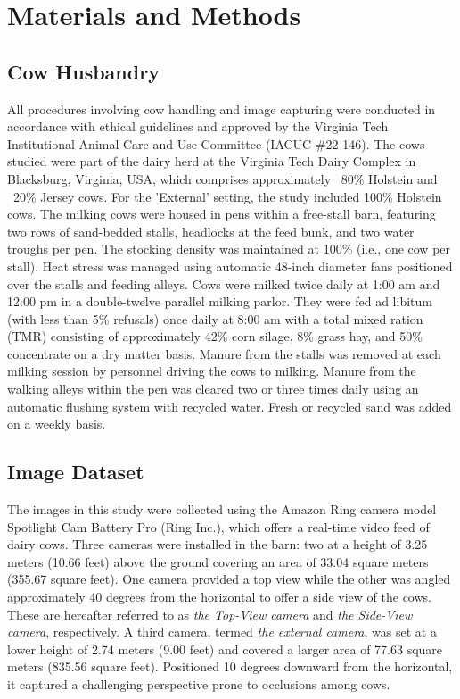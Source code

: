 \section{Materials and Methods}

\subsection*{Cow Husbandry}

All procedures involving cow handling and image capturing were conducted in accordance with ethical guidelines and approved by the Virginia Tech Institutional Animal Care and Use Committee (IACUC \#22-146). The cows studied were part of the dairy herd at the Virginia Tech Dairy Complex in Blacksburg, Virginia, USA, which comprises approximately ~80\% Holstein and ~20\% Jersey cows. For the 'External' setting, the study included  100\% Holstein cows. The milking cows were housed in pens within a free-stall barn, featuring two rows of sand-bedded stalls, headlocks at the feed bunk, and two water troughs per pen. The stocking density was maintained at 100\% (i.e., one cow per stall). Heat stress was managed using automatic 48-inch diameter fans positioned over the stalls and feeding alleys. Cows were milked twice daily at 1:00 am and 12:00 pm in a double-twelve parallel milking parlor. They were fed ad libitum (with less than 5\% refusals) once daily at 8:00 am with a total mixed ration (TMR) consisting of approximately 42\% corn silage, 8\% grass hay, and 50\% concentrate on a dry matter basis. Manure from the stalls was removed at each milking session by personnel driving the cows to milking. Manure from the walking alleys within the pen was cleared two or three times daily using an automatic flushing system with recycled water. Fresh or recycled sand was added on a weekly basis.

\subsection*{Image Dataset}

The images in this study were collected using the Amazon Ring camera model Spotlight Cam Battery Pro (Ring Inc.), which offers a real-time video feed of dairy cows. Three cameras were installed in the barn: two at a height of 3.25 meters (10.66 feet) above the ground covering an area of 33.04 square meters (355.67 square feet). One camera provided a top view while the other was angled approximately 40 degrees from the horizontal to offer a side view of the cows. These are hereafter referred to as \textit{the Top-View camera} and \textit{the Side-View camera}, respectively. A third camera, termed \textit{the external camera}, was set at a lower height of 2.74 meters (9.00 feet) and covered a larger area of 77.63 square meters (835.56 square feet). Positioned 10 degrees downward from the horizontal, it captured a challenging perspective prone to occlusions among cows.

